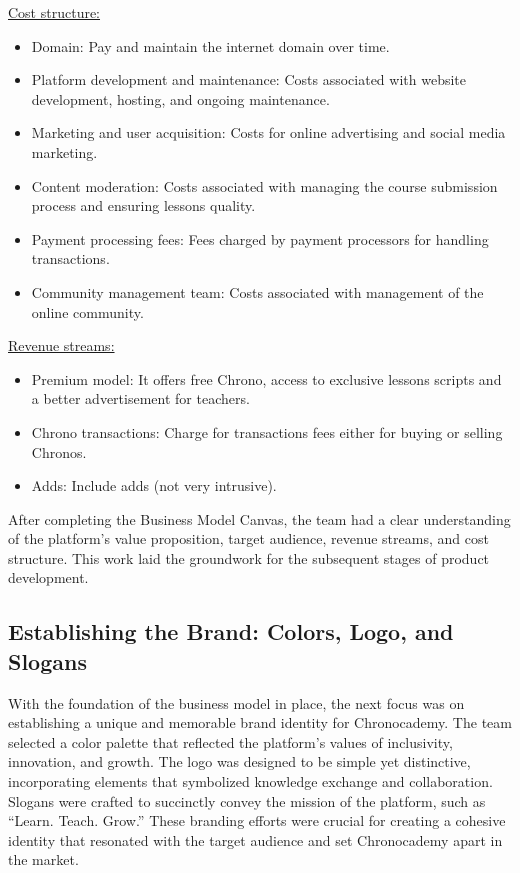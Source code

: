\underline{Cost structure:}
\begin{itemize}
\item Domain: Pay and maintain the internet domain over time.
\item Platform development and maintenance: Costs associated with website development, hosting, and ongoing maintenance.
\item Marketing and user acquisition: Costs for online advertising and social media marketing.
\item Content moderation: Costs associated with managing the course submission process and ensuring lessons quality.
\item Payment processing fees: Fees charged by payment processors for handling transactions.
\item Community management team: Costs associated with management of the online community.
\end{itemize}

\underline{Revenue streams:}
\begin{itemize}
\item Premium model: It offers free Chrono, access to exclusive lessons scripts and a better advertisement for teachers.
\item Chrono transactions: Charge for transactions fees either for buying or selling Chronos.
\item Adds: Include adds (not very intrusive).
\end{itemize}

After completing the Business Model Canvas, the team had a clear understanding of the platform's value proposition, target audience, revenue streams, and cost structure.
This work laid the groundwork for the subsequent stages of product development.

\subsection{Establishing the Brand: Colors, Logo, and Slogans}\label{subsec:establishing-the-brand:-colors-logo-and-slogans}
With the foundation of the business model in place, the next focus was on establishing a unique and memorable brand identity for Chronocademy.
The team selected a color palette that reflected the platform’s values of inclusivity, innovation, and growth.
The logo was designed to be simple yet distinctive, incorporating elements that symbolized knowledge exchange and collaboration.
Slogans were crafted to succinctly convey the mission of the platform, such as ``Learn.
Teach.
Grow.'' These branding efforts were crucial for creating a cohesive identity that resonated with the target audience and set Chronocademy apart in the market.

